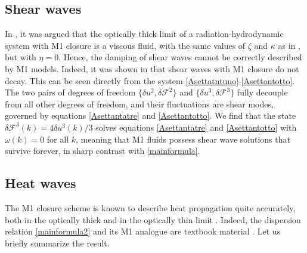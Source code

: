 \documentclass[a4paper, amsfonts, amssymb, amsmath, reprint, showkeys, nofootinbib, twoside,notitlepage,onecolumn]{revtex4-2}
\theoremstyle{definition}
\theoremstyle{theorem}
\theoremstyle{corollary}
\begin{document}
\subsection{Shear waves}

In \cite{AndersonSpiegel1972,GavassinoRadiazione,GavassinoFronntiers2021}, it was argued that the optically thick limit of a radiation-hydrodynamic system with M1 closure is a viscous fluid, with the same values of $\zeta$ and $\kappa$ as in \cite{Weinberg1971}, but with $\eta=0$. Hence, the damping of shear waves cannot be correctly described by M1 models. Indeed, it was shown in \cite{GavassinoShearRadiation2024jej} that shear waves with M1 closure do not decay. This can be seen directly from the system \eqref{Asettatntuno}-\eqref{Asettantotto}. The two pairs of degrees of freedom $\{\delta u^2,\delta \mathcal{F}^2 \}$ and $\{\delta u^3,\delta \mathcal{F}^3 \}$ fully decouple from all other degrees of freedom, and their fluctuations are shear modes, governed by equations \eqref{Asettantatre} and \eqref{Asettantotto}. We find that the state $\delta \mathcal{F}^3(k)=4\delta u^3(k)/3$ solves equations \eqref{Asettantatre} and \eqref{Asettantotto} with $\omega(k)=0$ for all $k$, meaning that M1 fluids possess shear wave solutions that survive forever, in sharp contrast with \eqref{mainformula}. 


\subsection{Heat waves}

The M1 closure scheme is known to describe heat propagation quite accurately, both in the optically thick and in the optically thin limit \cite{Sadowski2013}. Indeed, the dispersion relation \eqref{mainformula2} and its M1 analogue are textbook material \cite[\S 100]{mihalas_book}. Let us briefly summarize the result.
\end{document}

